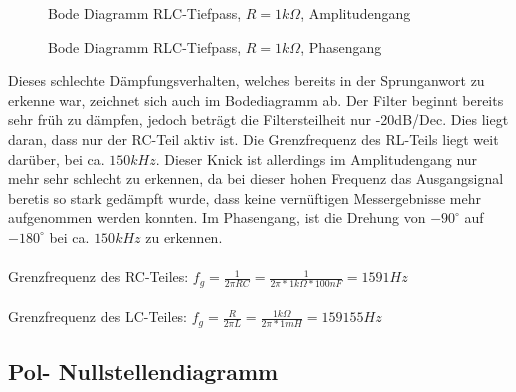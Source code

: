 \begin{figure}[H]
  \centering
  \caption{Bode Diagramm RLC-Tiefpass, $R=1k\Omega$, Amplitudengang}
\end{figure}
\begin{figure}[H]
  \centering
  \caption{Bode Diagramm RLC-Tiefpass, $R=1k\Omega$, Phasengang}
\end{figure}
Dieses schlechte D\"ampfungsverhalten, welches bereits in der Sprunganwort zu erkenne war, zeichnet sich auch im Bodediagramm ab. Der Filter beginnt bereits sehr fr\"uh zu d\"ampfen, jedoch betr\"agt die Filtersteilheit nur -20dB/Dec. Dies liegt daran, dass nur der RC-Teil aktiv ist. Die Grenzfrequenz des RL-Teils liegt weit dar\"uber, bei ca. $150kHz$. Dieser Knick ist allerdings im Amplitudengang nur mehr sehr schlecht zu erkennen, da bei dieser hohen Frequenz das Ausgangsignal beretis so stark ged\"ampft wurde, dass keine vern\"uftigen Messergebnisse mehr aufgenommen werden konnten. Im Phasengang, ist die Drehung von $-90^\circ$ auf $-180^\circ$ bei ca. $150kHz$ zu erkennen. \\ \\
Grenzfrequenz des RC-Teiles: $f_g=\frac{1}{2\pi RC}=\frac{1}{2\pi*1k\Omega *100nF}=1591Hz$ \\ \\
Grenzfrequenz des LC-Teiles: $f_g=\frac{R}{2\pi L} = \frac{1k\Omega}{2\pi*1mH}=159155Hz$

\subsection{Pol- Nullstellendiagramm}

